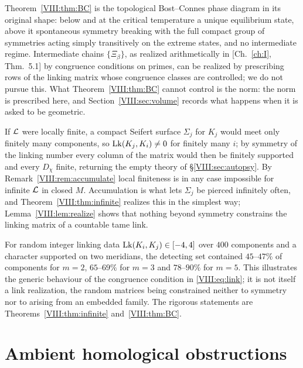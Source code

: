 \begin{remark}
Theorem~\ref{VIII:thm:BC} is the topological Bost--Connes phase diagram in its original shape:
below and at the critical temperature a unique equilibrium state, above it spontaneous
symmetry breaking with the full compact group of symmetries acting simply transitively on the
extreme states, and no intermediate regime. Intermediate chains $\{\Xi_\beta\}$, as realized
arithmetically in [Ch.~\ref{ch:I}, Thm.~5.1] by congruence conditions on primes, can be
realized by prescribing rows of the linking matrix whose congruence classes are controlled;
we do not pursue this. What Theorem~\ref{VIII:thm:BC} cannot control is the norm: the norm is
prescribed here, and Section~\ref{VIII:sec:volume} records what happens when it is asked to be
geometric.
\end{remark}

\begin{remark}\label{VIII:rem:whyaccum}
If $\mathcal{L}$ were locally finite, a compact Seifert surface $\Sigma_j$ for $K_j$ would meet only
finitely many components, so $\operatorname{Lk}(K_j,K_i)\ne0$ for finitely many $i$; by symmetry of the
linking number every column of the matrix would then be finitely supported and every $D_\chi$
finite, returning the empty theory of \S\ref{VIII:sec:autopsy}. By Remark~\ref{VIII:rem:accumulate}
local finiteness is in any case impossible for infinite $\mathcal{L}$ in closed $M$. Accumulation is
what lets $\Sigma_j$ be pierced infinitely often, and Theorem~\ref{VIII:thm:infinite} realizes
this in the simplest way; Lemma~\ref{VIII:lem:realize} shows that nothing beyond symmetry
constrains the linking matrix of a countable tame link.
\end{remark}

\begin{remark}\label{VIII:rem:numdensity}
For random integer linking data $\operatorname{Lk}(K_i,K_j)\in[-4,4]$ over $400$ components and a character
supported on two meridians, the detecting set contained $45$--$47\%$ of components for $m=2$,
$65$--$69\%$ for $m=3$ and $78$--$90\%$ for $m=5$. This illustrates the generic behaviour of
the congruence condition in \eqref{VIII:eq:link}; it is not itself a link realization, the random
matrices being constrained neither to symmetry nor to arising from an embedded family. The
rigorous statements are Theorems~\ref{VIII:thm:infinite} and~\ref{VIII:thm:BC}.
\end{remark}

\section{Ambient homological obstructions}\label{VIII:sec:ambient}

